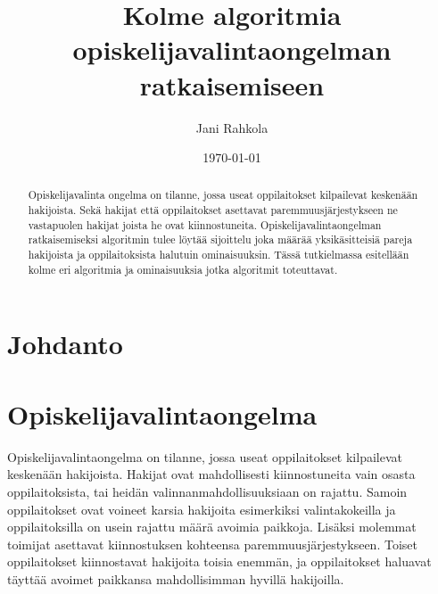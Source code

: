 \documentclass[gradu, twoside]{tktltiki}
\begin{document}
\title{Kolme algoritmia opiskelijavalintaongelman ratkaisemiseen}
\author{Jani Rahkola}
\date{\today}
\numberofpagesinformation{}



\maketitle

\doublespacing

\subject{Tietojenkäsittelytiede}

\begin{abstract}
Opiskelijavalinta ongelma on tilanne, jossa useat oppilaitokset
kilpailevat keskenään hakijoista. Sekä hakijat että oppilaitokset
asettavat paremmuusjärjestykseen ne vastapuolen hakijat joista he ovat
kiinnostuneita. Opiskelijavalintaongelman ratkaisemiseksi algoritmin
tulee löytää sijoittelu joka määrää yksikäsitteisiä pareja hakijoista
ja oppilaitoksista halutuin ominaisuuksin. Tässä tutkielmassa
esitellään kolme eri algoritmia ja ominaisuuksia jotka algoritmit
toteuttavat.
\end{abstract}

\mytableofcontents

\section{Johdanto}

\section{Opiskelijavalintaongelma}

Opiskelijavalintaongelma on tilanne, jossa useat oppilaitokset
kilpailevat keskenään hakijoista. Hakijat ovat mahdollisesti
kiinnostuneita vain osasta oppilaitoksista, tai heidän
valinnanmahdollisuuksiaan on rajattu. Samoin oppilaitokset ovat
voineet karsia hakijoita esimerkiksi valintakokeilla ja
oppilaitoksilla on usein rajattu määrä avoimia paikkoja. Lisäksi
molemmat toimijat asettavat kiinnostuksen kohteensa
paremmuusjärjestykseen. Toiset oppilaitokset kiinnostavat hakijoita
toisia enemmän, ja oppilaitokset haluavat täyttää avoimet paikkansa
mahdollisimman hyvillä hakijoilla.
\end{document}
